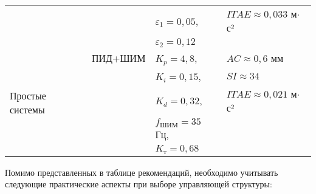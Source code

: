 \begin{table}[ht]
\begin{tabular}{p{3.5cm}p{3cm}p{4cm}p{4cm}}
		                                                                  &                                  & $\varepsilon_1=0,05$,       & $ITAE \approx 0,033$ м$\cdot$с² \\
		                                                                  &                                  & $\varepsilon_2=0,12$        &                                 \\
		\hline
		\multirow{5}{3.5cm}{Простые системы}                              & ПИД+ШИМ                          & $K_p=4,8$,                  & $AC \approx 0,6$ мм             \\
		                                                                  &                                  & $K_i=0,15$,                 & $SI \approx 34$                 \\
		                                                                  &                                  & $K_d=0,32$,                 & $ITAE \approx 0,021$ м$\cdot$с² \\
		                                                                  &                                  & $f_{ШИМ}=35$ Гц,            &                                 \\
		                                                                  &                                  & $K_т=0,68$                  &                                 \\
		\midrule
	\end{tabular}
\end{table}

Помимо представленных в таблице рекомендаций, необходимо учитывать следующие практические
аспекты при выборе управляющей структуры:

